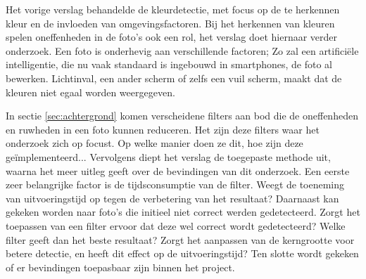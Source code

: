 Het vorige verslag behandelde de kleurdetectie, met focus op de te herkennen kleur en de invloeden van omgevingsfactoren. Bij het herkennen van kleuren spelen oneffenheden in de foto's ook een rol, het verslag doet hiernaar verder onderzoek. Een foto is onderhevig aan verschillende factoren; Zo zal een artificiële intelligentie, die nu vaak standaard is ingebouwd in smartphones, de foto al bewerken. Lichtinval, een ander scherm of zelfs een vuil scherm, maakt dat de kleuren niet egaal worden weergegeven.

In sectie \ref{sec:achtergrond} komen verscheidene filters aan bod die de oneffenheden en ruwheden in een foto kunnen reduceren. Het zijn deze filters waar het onderzoek zich op focust. Op welke manier doen ze dit, hoe zijn deze geïmplementeerd... Vervolgens diept het verslag de toegepaste methode uit, waarna het meer uitleg geeft over de bevindingen van dit onderzoek. Een eerste zeer belangrijke factor is de tijdsconsumptie van de filter. Weegt de toeneming van uitvoeringstijd op tegen de verbetering van het resultaat? Daarnaast kan gekeken worden naar foto's die initieel niet correct werden gedetecteerd. Zorgt het toepassen van een filter ervoor dat deze wel correct wordt gedetecteerd? Welke filter geeft dan het beste resultaat? Zorgt het aanpassen van de kerngrootte voor betere detectie, en heeft dit effect op de uitvoeringstijd? Ten slotte wordt gekeken of er bevindingen toepasbaar zijn binnen het project.